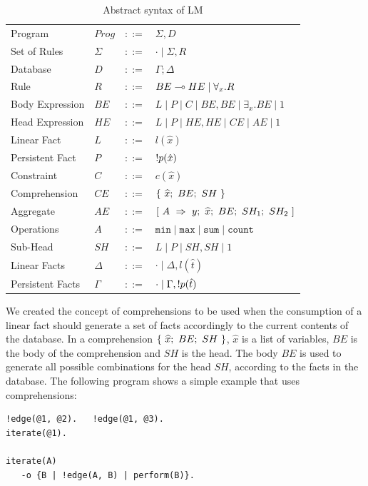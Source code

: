 \begin{table}[ht]
\centering
{\scriptsize
\begin{tabular}{llcl}
Program          & $Prog$ & $::=$ & $\Sigma, D$ \\
Set of Rules     & $\Sigma$ & $::=$ & $\cdot \; | \; \Sigma, R$\\
Database         & $D$ & $::=$ & $\Gamma; \Delta$ \\
Rule             & $R$ & $::=$ & $BE \multimap HE \; | \; \forall_{x}. R$ \\
Body Expression  & $BE$ & $::=$ & $L \; | \; P \; | \; C \; | \; BE, BE \; | \; \exists_{x}. BE \; | \; 1$\\
Head Expression  & $HE$ & $::=$ & $L \; | \; P \; | \; HE, HE \; | \; CE \; | \; AE \; | \; 1$\\
Linear Fact      & $L$ & $::=$ & $l(\hat{x})$\\
Persistent Fact  & $P$ & $::=$ & ${!} p(\hat{x})$\\
Constraint       & $C$ & $::=$ & $c(\hat{x})$ \\
Comprehension    & $CE$ & $::=$ & $\{~\widehat{x};~BE;~SH~\}$ \\
Aggregate        & $AE$ & $::=$ & $[~A~\Rightarrow~y;~\widehat{x};~BE;~SH_1;~SH_2~]$ \\
Operations       & $A$ & $::=$ & $\mathtt{min} \; | \; \mathtt{max} \; | \; \mathtt{sum} \; | \; \mathtt{count}$ \\
Sub-Head         & $SH$ & $::=$ & $L \; | \; P \; | \; SH, SH \; | \; 1$\\
Linear Facts     & $\Delta$ & $::=$ & $\cdot \; | \; \Delta, l(\hat{t})$ \\
Persistent Facts & $\Gamma$ & $::=$ & $\cdot \; | \; \Gamma, {!} p(\hat{t})$ \\
\end{tabular}
}
\caption{Abstract syntax of LM}
\label{tbl:ast}
\end{table}

We created the concept of comprehensions to be used when the
consumption of a linear fact should generate a set of facts
accordingly to the current contents of the database. In a
comprehension $\{~\widehat{x};~BE;~SH~\}$, $\widehat{x}$ is a list of variables,
$BE$ is the body of the comprehension and $SH$ is the head. The body
$BE$ is used to generate all possible combinations for the head $SH$,
according to the facts in the database. The following program shows a
simple example that uses comprehensions:

{\footnotesize
\begin{Verbatim}
!edge(@1, @2).   !edge(@1, @3).
iterate(@1).

iterate(A)
   -o {B | !edge(A, B) | perform(B)}.
\end{Verbatim}
}

